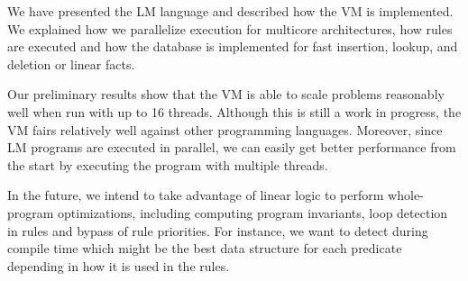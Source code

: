We have presented the LM language and described how the VM is implemented.
We explained how we parallelize execution for multicore architectures, how rules are executed and how the database
is implemented for fast insertion, lookup, and deletion or linear facts.

Our preliminary results show that the VM is able to scale problems reasonably well when run with up to 16 threads.
Although this is still a work in progress, the VM fairs relatively well against other programming languages.
Moreover, since LM programs are executed in parallel, we can easily get better performance from the start by executing
the program with multiple threads.

In the future, we intend to take advantage of linear logic to perform whole-program optimizations,
including computing program invariants, loop detection in rules and bypass of rule priorities. For instance,
we want to detect during compile time which might be the best data structure for each predicate depending in how it
is used in the rules.